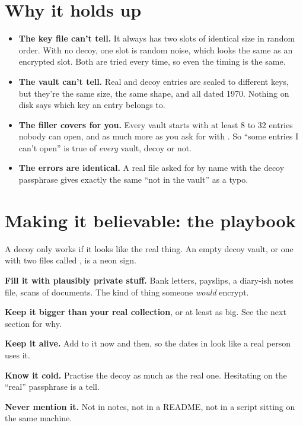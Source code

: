 \documentclass[10pt,oneside,openany]{book}
\begin{document}
\section{Why it holds up}

\begin{itemize}
  \item \textbf{The key file can't tell.} It always has two slots of identical
        size in random order. With no decoy, one slot is random noise, which
        looks the same as an encrypted slot. Both are tried every time, so
        even the timing is the same.
  \item \textbf{The vault can't tell.} Real and decoy entries are sealed to
        different keys, but they're the same size, the same shape, and all
        dated 1970. Nothing on disk says which key an entry belongs to.
  \item \textbf{The filler covers for you.} Every vault starts with at
        least 8 to 32 entries nobody can open, and as much more as you ask
        for with . So ``some entries I can't open'' is true of
        \emph{every} vault, decoy or not.
  \item \textbf{The errors are identical.} A real file asked for by name with
        the decoy passphrase gives exactly the same ``not in the vault'' as
        a typo.
\end{itemize}

\section{Making it believable: the playbook}

A decoy only works if it looks like the real thing. An empty decoy vault, or
one with two files called , is a neon sign.

\begin{checks}
  \item \textbf{Fill it with plausibly private stuff.} Bank letters, payslips,
        a diary-ish notes file, scans of documents. The kind of thing someone
        \emph{would} encrypt.
  \item \textbf{Keep it bigger than your real collection}, or at least as big.
        See the next section for why.
  \item \textbf{Keep it alive.} Add to it now and then, so the dates in
         look like a real person uses it.
  \item \textbf{Know it cold.} Practise the decoy as much as the real one.
        Hesitating on the ``real'' passphrase is a tell.
  \item \textbf{Never mention it.} Not in notes, not in a README, not
        in a script sitting on the same machine.
\end{checks}
\end{document}

